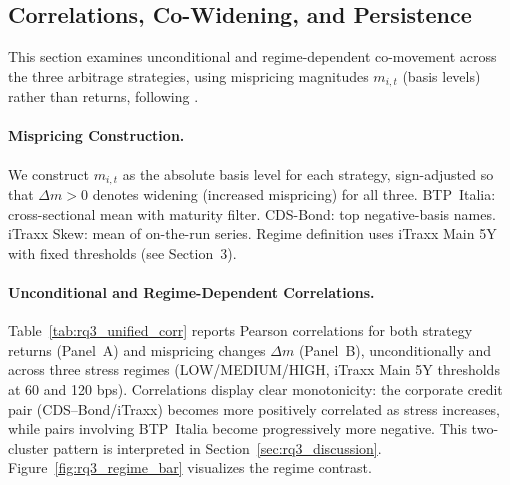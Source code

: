 

\subsection{Correlations, Co-Widening, and Persistence}
\label{sec:rq3_corr}

This section examines unconditional and regime-dependent co-movement across
the three arbitrage strategies, using mispricing magnitudes $m_{i,t}$ (basis levels)
rather than returns, following \citet{duffie2010presidential}.

\paragraph{Mispricing Construction.}
We construct $m_{i,t}$ as the absolute basis level for each strategy, sign-adjusted
so that $\Delta m > 0$ denotes widening (increased mispricing) for all three.
BTP~Italia: cross-sectional mean with maturity filter. CDS-Bond: top negative-basis
names. iTraxx Skew: mean of on-the-run series. Regime definition uses iTraxx Main
5Y with fixed thresholds (see Section~3).

\paragraph{Unconditional and Regime-Dependent Correlations.}
Table~\ref{tab:rq3_unified_corr} reports Pearson correlations for both
strategy returns (Panel~A) and mispricing changes $\Delta m$ (Panel~B),
unconditionally and across three stress regimes (LOW/MEDIUM/HIGH,
iTraxx Main 5Y thresholds at 60 and 120 bps).
Correlations display clear monotonicity: the corporate credit pair
(CDS--Bond/iTraxx) becomes more positively correlated as stress
increases, while pairs involving BTP~Italia become progressively more
negative. This two-cluster pattern is interpreted in Section~\ref{sec:rq3_discussion}.
Figure~\ref{fig:rq3_regime_bar} visualizes the regime contrast.



